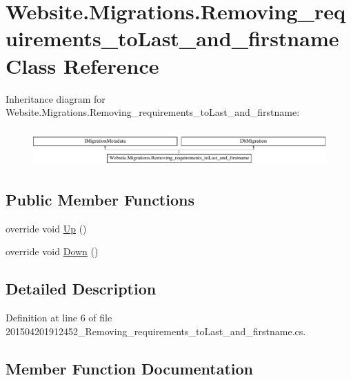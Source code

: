 \hypertarget{class_website_1_1_migrations_1_1_removing__requirements__to_last__and__firstname}{}\section{Website.\+Migrations.\+Removing\+\_\+requirements\+\_\+to\+Last\+\_\+and\+\_\+firstname Class Reference}
\label{class_website_1_1_migrations_1_1_removing__requirements__to_last__and__firstname}
Inheritance diagram for Website.\+Migrations.\+Removing\+\_\+requirements\+\_\+to\+Last\+\_\+and\+\_\+firstname\+:\begin{figure}[H]
\begin{center}
\leavevmode
\includegraphics[height=1.432225cm]{class_website_1_1_migrations_1_1_removing__requirements__to_last__and__firstname}
\end{center}
\end{figure}
\subsection*{Public Member Functions}
\begin{DoxyCompactItemize}
\item 
override void \hyperlink{class_website_1_1_migrations_1_1_removing__requirements__to_last__and__firstname_aabe33d3c2d99d5c4d5d24ac36aa4c2f6}{Up} ()
\item 
override void \hyperlink{class_website_1_1_migrations_1_1_removing__requirements__to_last__and__firstname_a3cd2de82eb23e19ee237f8c35d27279e}{Down} ()
\end{DoxyCompactItemize}


\subsection{Detailed Description}


Definition at line 6 of file 201504201912452\+\_\+\+Removing\+\_\+requirements\+\_\+to\+Last\+\_\+and\+\_\+firstname.\+cs.



\subsection{Member Function Documentation}
\hypertarget{class_website_1_1_migrations_1_1_removing__requirements__to_last__and__firstname_a3cd2de82eb23e19ee237f8c35d27279e}{}
